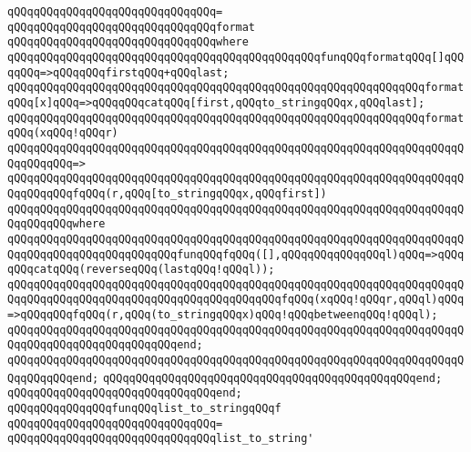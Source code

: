 \verb|qQQqqQQqqQQqqQQqqQQqqQQqqQQqqQQq=|\newline
\verb|qQQqqQQqqQQqqQQqqQQqqQQqqQQqqQQqformat|\newline
\verb|qQQqqQQqqQQqqQQqqQQqqQQqqQQqqQQqwhere|\newline
\verb|qQQqqQQqqQQqqQQqqQQqqQQqqQQqqQQqqQQqqQQqqQQqqQQqfunqQQqformatqQQq[]qQQqqQQq=>qQQqqQQqfirstqQQq+qQQqlast;|\newline
\verb|qQQqqQQqqQQqqQQqqQQqqQQqqQQqqQQqqQQqqQQqqQQqqQQqqQQqqQQqqQQqqQQqformatqQQq[x]qQQq=>qQQqqQQqcatqQQq[first,qQQqto_stringqQQqx,qQQqlast];|\newline
\newline
\verb|qQQqqQQqqQQqqQQqqQQqqQQqqQQqqQQqqQQqqQQqqQQqqQQqqQQqqQQqqQQqqQQqformatqQQq(xqQQq!qQQqr)|\newline
\verb|qQQqqQQqqQQqqQQqqQQqqQQqqQQqqQQqqQQqqQQqqQQqqQQqqQQqqQQqqQQqqQQqqQQqqQQqqQQqqQQq=>|\newline
\verb|qQQqqQQqqQQqqQQqqQQqqQQqqQQqqQQqqQQqqQQqqQQqqQQqqQQqqQQqqQQqqQQqqQQqqQQqqQQqqQQqfqQQq(r,qQQq[to_stringqQQqx,qQQqfirst])|\newline
\verb|qQQqqQQqqQQqqQQqqQQqqQQqqQQqqQQqqQQqqQQqqQQqqQQqqQQqqQQqqQQqqQQqqQQqqQQqqQQqqQQqwhere|\newline
\verb|qQQqqQQqqQQqqQQqqQQqqQQqqQQqqQQqqQQqqQQqqQQqqQQqqQQqqQQqqQQqqQQqqQQqqQQqqQQqqQQqqQQqqQQqqQQqqQQqfunqQQqfqQQq([],qQQqqQQqqQQqqQQql)qQQq=>qQQqqQQqcatqQQq(reverseqQQq(lastqQQq!qQQql));|\newline
\verb|qQQqqQQqqQQqqQQqqQQqqQQqqQQqqQQqqQQqqQQqqQQqqQQqqQQqqQQqqQQqqQQqqQQqqQQqqQQqqQQqqQQqqQQqqQQqqQQqqQQqqQQqqQQqqQQqfqQQq(xqQQq!qQQqr,qQQql)qQQq=>qQQqqQQqfqQQq(r,qQQq(to_stringqQQqx)qQQq!qQQqbetweenqQQq!qQQql);|\newline
\verb|qQQqqQQqqQQqqQQqqQQqqQQqqQQqqQQqqQQqqQQqqQQqqQQqqQQqqQQqqQQqqQQqqQQqqQQqqQQqqQQqqQQqqQQqqQQqqQQqend;|\newline
\verb|qQQqqQQqqQQqqQQqqQQqqQQqqQQqqQQqqQQqqQQqqQQqqQQqqQQqqQQqqQQqqQQqqQQqqQQqqQQqqQQqend;|\newline
\verb|qQQqqQQqqQQqqQQqqQQqqQQqqQQqqQQqqQQqqQQqqQQqqQQqend;|\newline
\verb|qQQqqQQqqQQqqQQqqQQqqQQqqQQqqQQqend;|\newline
\newline
\newline
\verb|qQQqqQQqqQQqqQQqfunqQQqlist_to_stringqQQqf|\newline
\verb|qQQqqQQqqQQqqQQqqQQqqQQqqQQqqQQq=|\newline
\verb|qQQqqQQqqQQqqQQqqQQqqQQqqQQqqQQqlist_to_string'|\newline
